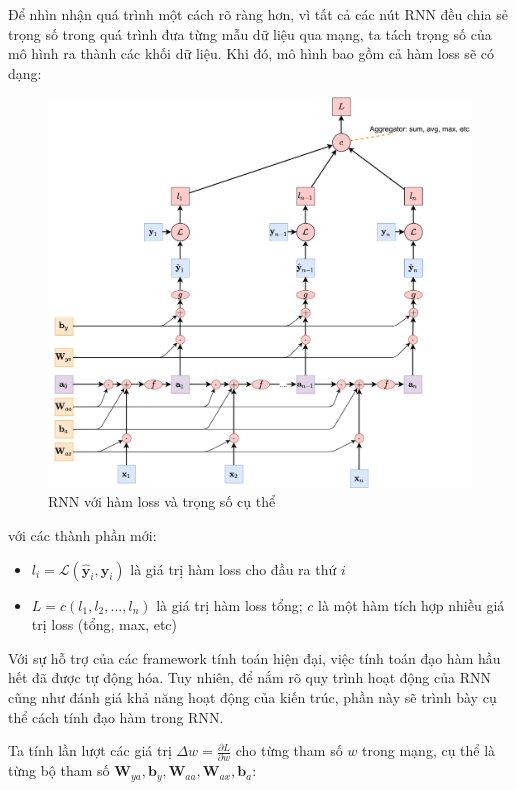 Để nhìn nhận quá trình một cách rõ ràng hơn, vì tất cả các nút RNN đều chia sẻ trọng số trong quá trình đưa từng mẫu dữ liệu qua mạng, ta tách trọng số của mô hình ra thành các khối dữ liệu. Khi đó, mô hình bao gồm cả hàm loss sẽ có dạng:
\begin{figure}[!h]
    \centering
    \includegraphics[width=\textwidth,height=\textheight,keepaspectratio]{books/artificial-neural-network/chapter06/figure-sec2345/rnn_backprop.pdf}
    \caption{RNN với hàm loss và trọng số cụ thể}
\end{figure}

với các thành phần mới:
\begin{itemize}
    \item $l_i = \mathcal{L}(\hat{\symbf{y}}_i, \symbf{y}_i)$ là giá trị hàm loss cho đầu ra thứ $i$
    \item $L = c(l_1,l_2,...,l_n)$ là giá trị hàm loss tổng; $c$ là một hàm tích hợp nhiều giá trị loss (tổng, max, etc)
\end{itemize}

Với sự hỗ trợ của các framework tính toán hiện đại, việc tính toán đạo hàm hầu hết đã được tự động hóa. Tuy nhiên, để nắm rõ quy trình hoạt động của RNN cũng như đánh giá khả năng hoạt động của kiến trúc, phần này sẽ trình bày cụ thể cách tính đạo hàm trong RNN.

Ta tính lần lượt các giá trị $\Delta w = \frac{\partial L}{\partial w}$ cho từng tham số $w$ trong mạng, cụ thể là từng bộ tham số $\symbf W_{ya}, \symbf b_y, \symbf W_{aa}, \symbf W_{ax}, \symbf b_a$:

